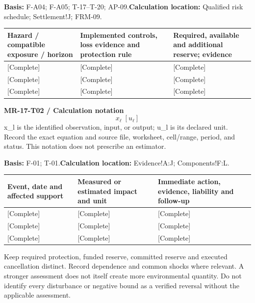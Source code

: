 \textbf{Basis:} F-A04; F-A05; T-17–T-20; AP-09.\quad\textbf{Calculation location:} Qualified risk schedule; Settlement!J; FRM-09.\par\endgroup
{\sffamily\fontsize{8.6}{10.7}\selectfont\begin{longtable}{@{}P{48mm}P{61mm}P{53mm}@{}}
\toprule
\textbf{Hazard / compatible exposure / horizon} & \textbf{Implemented controls, loss evidence and protection rule} & \textbf{Required, available and additional reserve; evidence}\\\midrule\endhead
\rule{0pt}{8mm}[Complete] & [Complete] & [Complete]\\\hline
\rule{0pt}{8mm}[Complete] & [Complete] & [Complete]\\\hline
\rule{0pt}{8mm}[Complete] & [Complete] & [Complete]\\\hline
\end{longtable}}
\par\begingroup\sffamily\fontsize{8.4}{10.5}\selectfont\color{NEBGreen}
\textbf{MR-17-T02 / Calculation notation}\
{\fontsize{10}{12}\selectfont\[x_{\ell}\;[u_{\ell}]\]}
x\_l is the identified observation, input, or output; u\_l is its declared unit. Record the exact equation and source file, worksheet, cell/range, period, and status. This notation does not prescribe an estimator.\par
\textbf{Basis:} F-01; T-01.\quad\textbf{Calculation location:} Evidence!A:J; Components!F:L.\par\endgroup
{\sffamily\fontsize{8.6}{10.7}\selectfont\begin{longtable}{@{}P{48mm}P{61mm}P{53mm}@{}}
\toprule
\textbf{Event, date and affected support} & \textbf{Measured or estimated impact and unit} & \textbf{Immediate action, evidence, liability and follow-up}\\\midrule\endhead
\rule{0pt}{8mm}[Complete] & [Complete] & [Complete]\\\hline
\rule{0pt}{8mm}[Complete] & [Complete] & [Complete]\\\hline
\rule{0pt}{8mm}[Complete] & [Complete] & [Complete]\\\hline
\end{longtable}}
Keep required protection, funded reserve, committed reserve and executed cancellation distinct. Record dependence and common shocks where relevant. A stronger assessment does not itself create more environmental quantity. Do not identify every disturbance or negative bound as a verified reversal without the applicable assessment.\par
